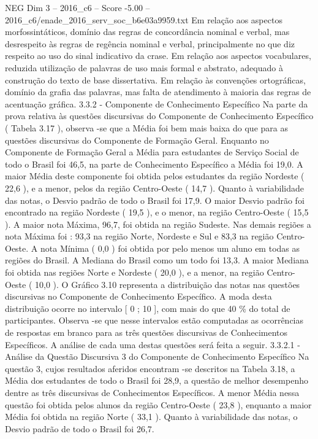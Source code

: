 \begin{textsample}{NEG Dim 3 – 2016\_c6 – Score -5.00 – 2016\_c6/enade\_2016\_serv\_soc\_b6e03a9959.txt}
Em relação aos aspectos morfossintáticos, domínio das regras de concordância nominal e verbal, mas desrespeito às regras de regência nominal e verbal, principalmente no que diz respeito ao uso do sinal indicativo da crase.
Em relação aos aspectos vocabulares, reduzida utilização de palavras de uso mais formal e abstrato, adequado à construção do texto de base dissertativa.
Em relação às convenções ortográficas, domínio da grafia das palavras, mas falta de atendimento à maioria das regras de acentuação gráfica. 3.3.2 - Componente de Conhecimento Específico Na parte da prova relativa às questões discursivas do Componente de Conhecimento Específico ( Tabela 3.17 ), observa -se que a Média foi bem mais baixa do que para as questões discursivas do Componente de Formação Geral.
Enquanto no Componente de Formação Geral a Média para estudantes de Serviço Social de todo o Brasil foi 46,5, na parte de Conhecimento Específico a Média foi 19,0.
A maior Média deste componente foi obtida pelos estudantes da região Nordeste ( 22,6 ), e a menor, pelos da região Centro-Oeste ( 14,7 ).
Quanto à variabilidade das notas, o Desvio padrão de todo o Brasil foi 17,9.
O maior Desvio padrão foi encontrado na região Nordeste ( 19,5 ), e o menor, na região Centro-Oeste ( 15,5 ).
A maior nota Máxima, 96,7, foi obtida na região Sudeste.
Nas demais regiões a nota Máxima foi : 93,3 na região Norte, Nordeste e Sul e 83,3 na região Centro-Oeste.
A nota Mínima ( 0,0 ) foi obtida por pelo menos um aluno em todas as regiões do Brasil.
A Mediana do Brasil como um todo foi 13,3.
A maior Mediana foi obtida nas regiões Norte e Nordeste ( 20,0 ), e a menor, na região Centro-Oeste ( 10,0 ).
O Gráfico 3.10 representa a distribuição das notas nas questões discursivas no Componente de Conhecimento Específico.
A moda desta distribuição ocorre no intervalo [ 0 ; 10 ], com mais do que 40 \% do total de participantes.
Observa -se que nesse intervalos estão computadas as ocorrências de respostas em branco para as três questões discursivas de Conhecimentos Específicos.
A análise de cada uma destas questões será feita a seguir. 3.3.2.1 - Análise da Questão Discursiva 3 do Componente de Conhecimento Específico Na questão 3, cujos resultados aferidos encontram -se descritos na Tabela 3.18, a Média dos estudantes de todo o Brasil foi 28,9, a questão de melhor desempenho dentre as três discursivas de Conhecimentos Específicos.
A menor Média nessa questão foi obtida pelos alunos da região Centro-Oeste ( 23,8 ), enquanto a maior Média foi obtida na região Norte ( 33,1 ).
Quanto à variabilidade das notas, o Desvio padrão de todo o Brasil foi 26,7.

\end{textsample}
